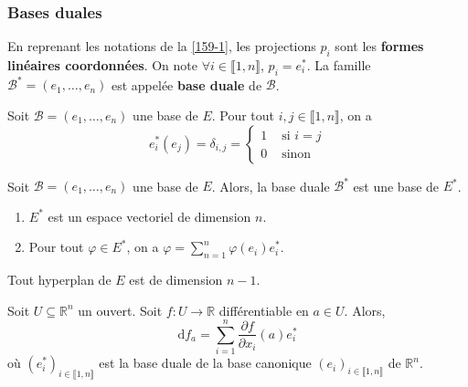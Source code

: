   \subsubsection{Bases duales}


  \begin{definition}
    En reprenant les notations de la \cref{159-1}, les projections $p_i$ sont les \textbf{formes linéaires coordonnées}. On note $\forall i \in \llbracket 1, n \rrbracket$, $p_i = e_i^*$. La famille $\mathcal{B}^* = (e_1, \dots, e_n)$ est appelée \textbf{base duale} de $\mathcal{B}$.
  \end{definition}

  \begin{remark}
    Soit $\mathcal{B} = (e_1, \dots, e_n)$ une base de $E$. Pour tout $i, j \in \llbracket 1, n \rrbracket$, on a
    \[ e_i^*(e_j) = \delta_{i,j} = \begin{cases} 1 &\text{ si } i = j \\ 0 &\text{ sinon} \end{cases} \]
  \end{remark}

  \begin{theorem}
    Soit $\mathcal{B} = (e_1, \dots, e_n)$ une base de $E$. Alors, la base duale $\mathcal{B}^*$ est une base de $E^*$.
  \end{theorem}

  \begin{corollary}
    \begin{enumerate}[label={\bfseries(\roman*)}]
      \item $E^*$ est un espace vectoriel de dimension $n$.
      \item Pour tout $\varphi \in E^*$, on a $\varphi = \sum_{n=1}^n \varphi(e_i) e_i^*$.
    \end{enumerate}
  \end{corollary}


  \begin{corollary}
    Tout hyperplan de $E$ est de dimension $n-1$.
  \end{corollary}


  \begin{example}
    Soit $U \subseteq \mathbb{R}^n$ un ouvert. Soit $f : U \rightarrow \mathbb{R}$ différentiable en $a \in U$. Alors,
    \[ \mathrm{d}f_a = \sum_{i=1}^n \frac{\partial f}{\partial x_i}(a) e_i^* \]
    où $(e_i^*)_{i \in \llbracket 1, n \rrbracket}$ est la base duale de la base canonique $(e_i)_{i \in \llbracket 1, n \rrbracket}$ de $\mathbb{R}^n$.
  \end{example}

